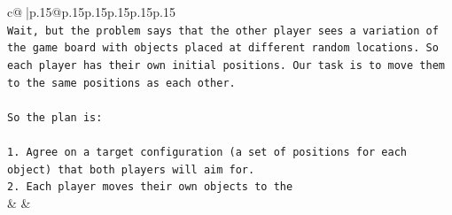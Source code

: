 \documentclass{article}
\begin{document}
{\begin{supertabular}{c@{$\;$}|p{.15\linewidth}@{}p{.15\linewidth}p{.15\linewidth}p{.15\linewidth}p{.15\linewidth}p{.15\linewidth}}
{{{\\ 
\texttt{Wait, but the problem says that the other player sees a variation of the game board with objects placed at different random locations. So each player has their own initial positions. Our task is to move them to the same positions as each other.} \\
\\ 
\texttt{So the plan is:} \\
\\ 
\texttt{1. Agree on a target configuration (a set of positions for each object) that both players will aim for.} \\
\texttt{2. Each player moves their own objects to the} \\
            }
        }
    }
    & & \\ \\


\end{supertabular}}
\end{document}
